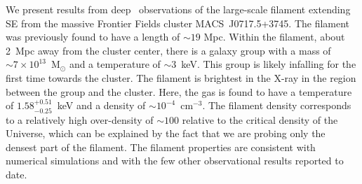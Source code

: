 We present results from deep \chandra\ observations of the large-scale filament extending SE from the massive Frontier Fields cluster MACS~J0717.5+3745. The filament was previously found to have a length of $\sim 19$ Mpc. Within the filament, about 2~Mpc away from the cluster center, there is a galaxy group with a mass of $\sim 7\times 10^{13}$~M$_\odot$ and a temperature of $\sim 3$~keV. This group is likely infalling for the first time towards the cluster. The filament is brightest in the X-ray in the region between the group and the cluster. Here, the gas is found to have a temperature of $1.58_{-0.25}^{+0.51}$~keV and a density of $\sim 10^{-4}$~cm$^{-3}$. The filament density corresponds to a relatively high over-density of $\sim 100$ relative to the critical density of the Universe, which can be explained by the fact that we are probing only the densest part of the filament. The filament properties are consistent with numerical simulations and with the few other observational results reported to date. 